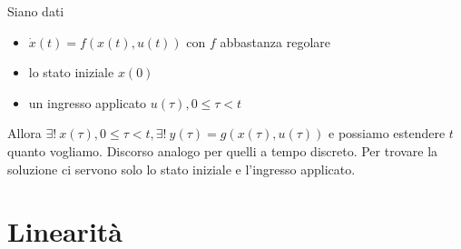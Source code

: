 Siano dati
\begin{itemize}
	\item $\dot{x}(t) =f(x(t) ,u(t))$ con $f$ abbastanza regolare
	\item lo stato iniziale $x(0)$
	\item un ingresso applicato $u(\tau) ,0\leq \tau < t$
\end{itemize}

Allora $\exists !\ x(\tau) ,0\leq \tau < t,\exists !\ y(\tau) =g(x(\tau) ,u(\tau))$ e possiamo estendere $t$ quanto vogliamo. Discorso analogo per quelli a tempo discreto. Per trovare la soluzione ci servono solo lo stato iniziale e l'ingresso applicato.

\section{Linearità}

